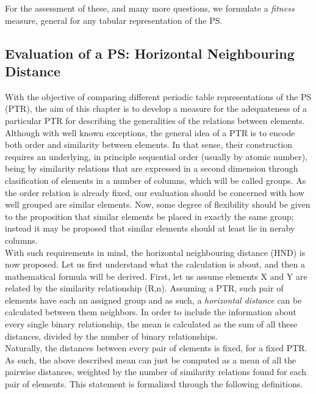 \documentclass[article]{article}
\begin{document}
For the assessment of these, and many more questions, we formulate a \textit{fitness} measure, general for any tabular representation of the PS.

\subsection{Evaluation of a PS: Horizontal Neighbouring Distance}

With the objective of comparing different periodic table representations of the PS (PTR), the aim of this chapter is to develop a measure for the adequateness of a particular PTR for describing the generalities of the relations between elements. \\

Although with well known exceptions, the general idea of a PTR is to encode both order and similarity between elements. In that sense, their construction requires an underlying, in principle sequential order (usually by atomic number), being  by similarity relations that are expressed in a second dimension through clasification of elements in a number of columns, which will be called groups. As the order relation is already fixed, our evaluation should be concerned with how well grouped are similar elements. Now, some degree of flexibility should be given to the proposition that similar elements be placed in exactly the same group; instead it may be proposed that similar elements should at least lie in neraby columns.\\

With such requirements in mind, the horizontal neighbouring distance (HND) is now proposed. Let us first understand what the calculation is about, and then a mathematical formula will be derived. First, let us assume elements X and Y are related by the similarity relationship (R,n). Assuming a PTR, such pair of elements have each an assigned group and as such, a \textit{horizontal distance} can be calculated between them neighbors. In order to include the information about every single binary relationship, the mean is calculated as the sum of all these distances, divided by the number of binary relationships.\\

Naturally, the distances between every pair of elements is fixed, for a fixed PTR. As such, the above described mean can just be computed as a mean of all the pairwise distances, weighted by the number of similarity relations found for each pair of elements. This statement is formalized through the following definitions.
\end{document}

